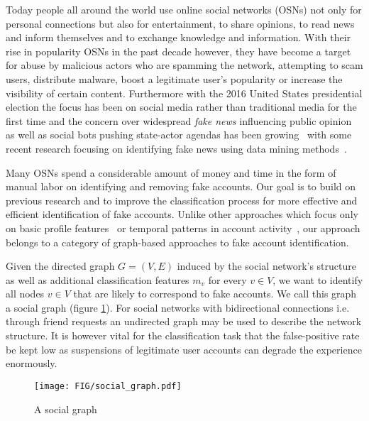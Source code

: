 Today people all around the world use online social networks (OSNs) not only for personal connections but also for entertainment, to share opinions, to read news and inform themselves and to exchange knowledge and information. With their rise in popularity OSNs in the past decade however, they have become a target for abuse by malicious actors who are spamming the network, attempting to scam users, distribute malware, boost a legitimate user's popularity or increase the visibility of certain content. Furthermore with the 2016 United States presidential election the focus has been on social media rather than traditional media for the first time and the concern over widespread \emph{fake news} influencing public opinion as well as social bots pushing state-actor agendas has been growing~\cite{allcott2017social,grinberg2019fake} with some recent research focusing on identifying fake news using data mining methods~\cite{shu2017fake}.

Many OSNs spend a considerable amount of money and time in the form of manual labor on identifying and removing fake accounts. Our goal is to build on previous research and to improve the classification process for more effective and efficient identification of fake accounts. Unlike other approaches which focus only on basic profile features~\cite{cresci2015fame,malhotra2012studying} or temporal patterns in account activity~\cite{chavoshi2017temporal,ferraz2015rsc,gurajala2015fake}, our approach belongs to a category of graph-based approaches to fake account identification.  

Given the directed graph $G=(V,E)$ induced by the social network's structure as well as additional classification features $m_v$ for every $v \in V$, we want to identify all nodes $v \in V$ that are likely to correspond to fake accounts. We call this graph a social graph (figure \ref{fig:social_graph}). For social networks with bidirectional connections i.e. through friend requests an undirected graph may be used to describe the network structure. It is however vital for the classification task that the false-positive rate be kept low as suspensions of legitimate user accounts can degrade the experience enormously.


\begin{figure}
    \centering
    \texttt{[image: FIG/social\_graph.pdf]}
    \caption{A social graph}
    \label{fig:social_graph}
\end{figure}


